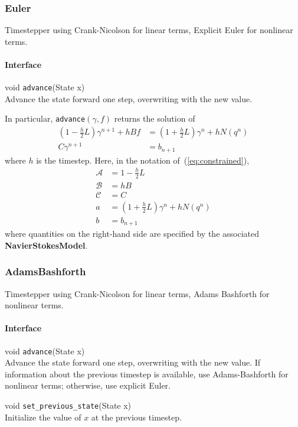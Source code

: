 \documentclass[11pt]{article}
\def\class#1{{\bf #1}} %
\def\fn#1{{\tt #1}} %
\begin{document}
\subsubsection{Euler}
Timestepper using Crank-Nicolson for linear terms, Explicit Euler for nonlinear terms.

\paragraph{Interface}
\begin{description}
	\item void \fn{advance}(State x)\\
		Advance the state forward one step, overwriting with the new value.  
\end{description}

In particular, \fn{advance}$(\gamma,f)$ returns the solution of
	\begin{align}
		(1-\frac{h}{2}L)\gamma^{n+1} + hBf &= (1 + \frac{h}{2}L)\gamma^n + h N(q^n)\\
		C\gamma^{n+1} &= b_{n+1}
	\end{align}
where $h$ is the timestep.  Here, in the notation of~(\ref{eq:constrained}),
\begin{align}
	\mathcal{A} &= 1-\frac{h}{2} L\\
	\mathcal{B} &= hB\\
	\mathcal{C} &= C\\
	a &= (1+\frac{h}{2}L)\gamma^n + hN(q^n)\\
	b &= b_{n+1}
\end{align}
where quantities on the right-hand side are specified by the associated \class{NavierStokesModel}.

\subsubsection{AdamsBashforth}
Timestepper using Crank-Nicolson for linear terms, Adams Bashforth for nonlinear terms.

\paragraph{Interface}
\begin{description}
	\item void \fn{advance}(State x)\\
		Advance the state forward one step, overwriting with the new value.  If information about the previous timestep is available, use Adams-Bashforth for nonlinear terms; otherwise, use explicit Euler.
	\item void \fn{set\_previous\_state}(State x)\\
		Initialize the value of $x$ at the previous timestep.
\end{description}
\end{document}
